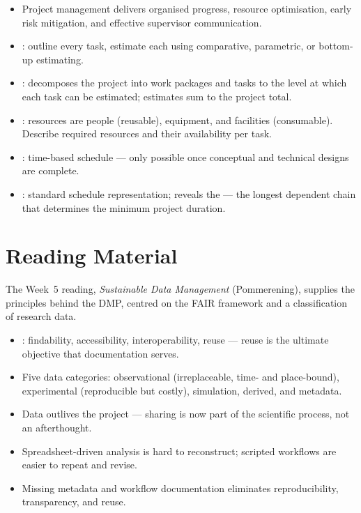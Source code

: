 \documentclass[../main.tex]{subfiles}
\begin{document}
\begin{itemize}
  \item Project management delivers organised progress, resource optimisation, early risk mitigation, and effective supervisor communication.
  \item {}: outline every task, estimate each using comparative, parametric, or bottom-up estimating.
  \item {}: decomposes the project into work packages and tasks to the level at which each task can be estimated; estimates sum to the project total.
  \item {}: resources are people (reusable), equipment, and facilities (consumable). Describe required resources and their availability per task.
  \item {}: time-based schedule — only possible once conceptual and technical designs are complete.
  \item {}: standard schedule representation; reveals the  — the longest dependent chain that determines the minimum project duration.
\end{itemize}

\section{Reading Material}
\label{sec:reading5}

\begin{partbox}
The Week~5 reading, \textit{Sustainable Data Management} (Pommerening), supplies the principles behind the DMP, centred on the FAIR framework and a classification of research data.
\end{partbox}

\begin{itemize}
  \item {}: findability, accessibility, interoperability, reuse — reuse is the ultimate objective that documentation serves.
  \item Five data categories: observational (irreplaceable, time- and place-bound), experimental (reproducible but costly), simulation, derived, and metadata.
  \item Data outlives the project — sharing is now part of the scientific process, not an afterthought.
  \item Spreadsheet-driven analysis is hard to reconstruct; scripted workflows are easier to repeat and revise.
  \item Missing metadata and workflow documentation eliminates reproducibility, transparency, and reuse.
\end{itemize}
\end{document}
